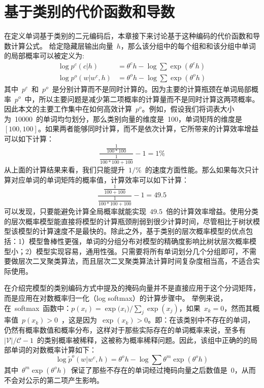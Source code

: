 \section{基于类别的代价函数和导数}
在定义单词基于类别的二元编码后，本章接下来讨论基于这种编码的代价函数和导数计算公式。
给定隐藏层输出向量~$h$，那么该分组中的每个组和和该分组中单词的局部概率可以被定义为:
\begin{equation}
\begin{split}
\log p^c(c|h) &= \theta^c h-\log \sum{\exp( \theta^c h )} \\
\log p^o(w|w^c,h)&=\theta^o h -\log\sum\exp{(\theta^o h)}
\end{split}
\end{equation}
其中~$p^c$~和~$p^o$~是分别计算而不是同时计算的。因为主要的计算瓶颈在单词局部概率~$p^o$~中，所以主要问题是减少第二项概率的计算量而不是同时计算这两项概率。因此本文的主要工作集中在如何高效计算~$p^o$。例如，假设我们将词表大小为~10000~的单词均匀划分，那么类别向量的维度是~100，单词矩阵的维度是~$[100,100]$。如果两者能够同时计算，而不是依次计算，它所带来的计算效率增益可以如下计算：
\begin{equation}\label{equ:example}
  \frac{\frac{1}{100*100}}{\frac{1}{100*100+100}}-1=1\%
\end{equation}
从上面的计算结果来看，我们只能提升~$1/\%$~的速度方面性能。那么如果每次只计算对应单词的单词矩阵的概率值，计算效率可以如下计算：
\begin{equation}\label{equ:example2}
  \frac{\frac{1}{100+100}}{\frac{1}{100*100+100}}-1=49.5
\end{equation}
可以发现，只要能避免计算全局概率就能实现~$49.5$~倍的计算效率增益。使用分类的层次概率模型能直接将模型的计算瓶颈削弱到很少计算时间，尽管相比于树状模型该模型的计算速度不是最快的。除此之外，基于类别的层次概率模型的优点包括：1）模型鲁棒性更强，单词的分组分布对模型的精确度影响比树状层次概率模型小；2）模型实现容易，通用性强。只需要将所有单词划分几个分组即可，不需要做层次二叉聚类算法，而且层次二叉聚类算法计算时间复杂度相当高，不适合实际使用。



在介绍完模型的类别编码方式中提及的掩码向量并不是直接应用于这个分词矩阵，而是应用在对数概率归一化（log softmax）的计算步骤中。 举例来说，在~softmax~函数中：$p(x_i)={\exp({x_i}})/{\sum_j\exp(x_j)}$，如果~$x_k=0$，然而其概率值~$p(x_k)>0$~，这是因为~$\exp(x_k)>0$。即：在该类别中不存在的单词，仍然有概率数值和概率分布，这样对于那些实际存在的单词概率来说，至多有~$\mathcal{|V|/\mathcal{C}}-1$~的类别概率被稀释，这被称为概率稀释问题。因此，该组中正确的的局部单词的对数概率计算如下：
\begin{equation}
  \log \tilde p^o(w|w^c,h)=\theta^o h -\log\sum\theta^m\exp(\theta^o h)
\end{equation}
其中~$\theta^m\exp(\theta^o h)$~保证了那些不存在的单词经过掩码向量之后数值是~0，从而不会对公示的第二项产生影响。

